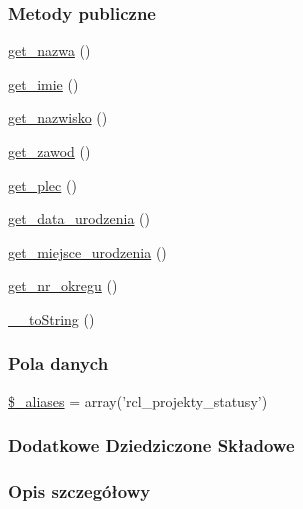 \subsubsection*{Metody publiczne}
\begin{DoxyCompactItemize}
\item 
\hyperlink{classep___r_c_l___projekt___status_ac0818f0049d7b84f08f77128f54cee36}{get\-\_\-nazwa} ()
\item 
\hyperlink{classep___r_c_l___projekt___status_ac4b0c85dc2a130038f2d118dbd0c3d77}{get\-\_\-imie} ()
\item 
\hyperlink{classep___r_c_l___projekt___status_abdd1d7ff92508da7f748ba1feec97af0}{get\-\_\-nazwisko} ()
\item 
\hyperlink{classep___r_c_l___projekt___status_af80ca8310b60004454dd02a387deaa2c}{get\-\_\-zawod} ()
\item 
\hyperlink{classep___r_c_l___projekt___status_ac7f9af5c3fa024e4c26a7b6bd4ce4bb4}{get\-\_\-plec} ()
\item 
\hyperlink{classep___r_c_l___projekt___status_a880b240cd2d8c336fd1709bf0cb1ae2c}{get\-\_\-data\-\_\-urodzenia} ()
\item 
\hyperlink{classep___r_c_l___projekt___status_ac57c08ec5e394a19c5bd9280c8376182}{get\-\_\-miejsce\-\_\-urodzenia} ()
\item 
\hyperlink{classep___r_c_l___projekt___status_a2645a9f0aa5b0ccc482943348c033d0a}{get\-\_\-nr\-\_\-okregu} ()
\item 
\hyperlink{classep___r_c_l___projekt___status_a7516ca30af0db3cdbf9a7739b48ce91d}{\-\_\-\-\_\-to\-String} ()
\end{DoxyCompactItemize}
\subsubsection*{Pola danych}
\begin{DoxyCompactItemize}
\item 
\hyperlink{classep___r_c_l___projekt___status_ab4e31d75f0bc5d512456911e5d01366b}{\$\-\_\-aliases} = array('rcl\-\_\-projekty\-\_\-statusy')
\end{DoxyCompactItemize}
\subsubsection*{Dodatkowe Dziedziczone Składowe}


\subsubsection{Opis szczegółowy}


